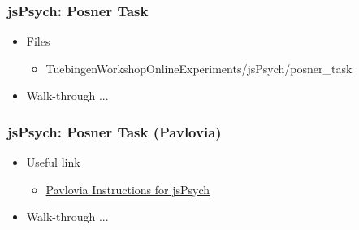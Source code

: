 \documentclass[t]{beamer}
\begin{document}
\begin{frame}[fragile]
    \frametitle{jsPsych: Posner Task}
    \begin{itemize}
        \item Files
            \begin{itemize}
                \item TuebingenWorkshopOnlineExperiments/jsPsych/posner\_task
            \end{itemize}
        \item Walk-through ... 
    \end{itemize}
\end{frame}

\begin{frame}[fragile]
    \frametitle{jsPsych: Posner Task (Pavlovia)}
    \begin{itemize}
        \item Useful link
            \begin{itemize}
                \item \href{https://pavlovia.org/js-psych}{Pavlovia Instructions for jsPsych}
            \end{itemize}
        \item Walk-through ... 
    \end{itemize}
\end{frame}

\end{document}
